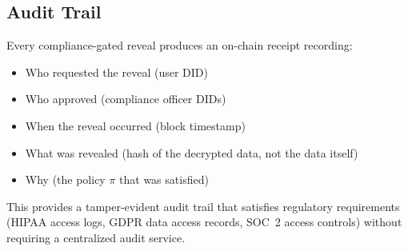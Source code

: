\subsection{Audit Trail}

Every compliance-gated reveal produces an on-chain receipt recording:
\begin{itemize}
    \item Who requested the reveal (user DID)
    \item Who approved (compliance officer DIDs)
    \item When the reveal occurred (block timestamp)
    \item What was revealed (hash of the decrypted data, not the data itself)
    \item Why (the policy $\pi$ that was satisfied)
\end{itemize}

This provides a tamper-evident audit trail that satisfies regulatory
requirements (HIPAA access logs, GDPR data access records, SOC~2 access
controls) without requiring a centralized audit service.

